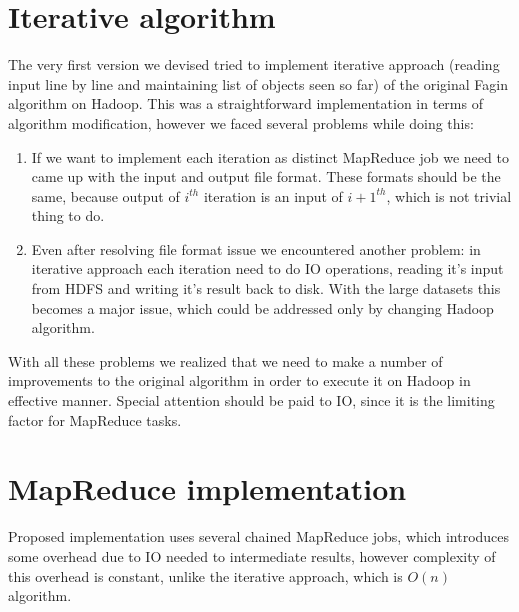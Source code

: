 \documentclass[a4paper]{article}
\begin{document}
\section{Iterative algorithm}
\label{sec:iterative}

The very first version we devised tried to implement iterative approach (reading input line by line and maintaining list of objects seen so far) of the original Fagin algorithm on Hadoop.
This was a straightforward implementation in terms of algorithm modification, however we faced several problems while doing this:
\begin{enumerate}
    \item If we want to implement each iteration as distinct MapReduce job we need to came up with the input and output file format.
    These formats should be the same, because output of $i^{th}$ iteration is an input of $i+1^{th}$, which is not trivial thing to do.
    \item Even after resolving file format issue we encountered another problem: in iterative approach each iteration need to do IO operations, reading it's input from HDFS and writing it's result back to disk.
    With the large datasets this becomes a major issue, which could be addressed only by changing Hadoop algorithm.
\end{enumerate}

With all these problems we realized that we need to make a number of improvements to the original algorithm in order to execute it on Hadoop in effective manner.
Special attention should be paid to IO, since it is the limiting factor for MapReduce tasks. 

\section{MapReduce implementation}
\label{sec:mapreduce}

Proposed implementation uses several chained MapReduce jobs, which introduces some overhead due to IO needed to intermediate results, however complexity of this overhead is constant, unlike the iterative approach, which is $O(n)$ algorithm.
\end{document}
